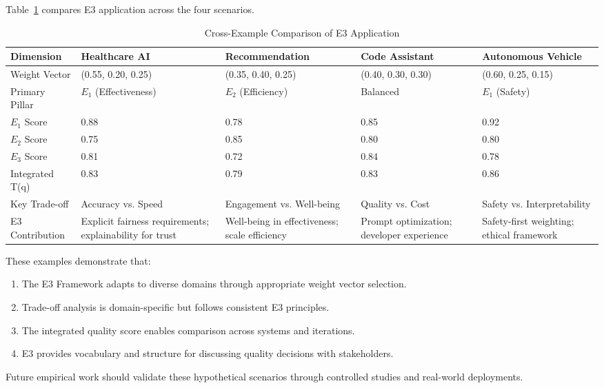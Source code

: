 Table~\ref{tab:examples_comparison} compares E3 application across the four scenarios.

\begin{table}[t]
\centering
\caption{Cross-Example Comparison of E3 Application}
\label{tab:examples_comparison}
\small
\begin{tabularx}{\textwidth}{@{}l X X X X@{}}
\toprule
\textbf{Dimension} & \textbf{Healthcare AI} & \textbf{Recommendation} & \textbf{Code Assistant} & \textbf{Autonomous Vehicle} \\
\midrule
Weight Vector & (0.55, 0.20, 0.25) & (0.35, 0.40, 0.25) & (0.40, 0.30, 0.30) & (0.60, 0.25, 0.15) \\
Primary Pillar & $E_1$ (Effectiveness) & $E_2$ (Efficiency) & Balanced & $E_1$ (Safety) \\
$E_1$ Score & 0.88 & 0.78 & 0.85 & 0.92 \\
$E_2$ Score & 0.75 & 0.85 & 0.80 & 0.80 \\
$E_3$ Score & 0.81 & 0.72 & 0.84 & 0.78 \\
Integrated T(q) & 0.83 & 0.79 & 0.83 & 0.86 \\
Key Trade-off & Accuracy vs. Speed & Engagement vs. Well-being & Quality vs. Cost & Safety vs. Interpretability \\
\addlinespace
E3 Contribution & Explicit fairness requirements; explainability for trust & Well-being in effectiveness; scale efficiency & Prompt optimization; developer experience & Safety-first weighting; ethical framework \\
\bottomrule
\end{tabularx}
\end{table}

These examples demonstrate that:

\begin{enumerate}[leftmargin=2em]
    \item The E3 Framework adapts to diverse domains through appropriate weight vector selection.
    \item Trade-off analysis is domain-specific but follows consistent E3 principles.
    \item The integrated quality score enables comparison across systems and iterations.
    \item E3 provides vocabulary and structure for discussing quality decisions with stakeholders.
\end{enumerate}

Future empirical work should validate these hypothetical scenarios through controlled studies and real-world deployments.